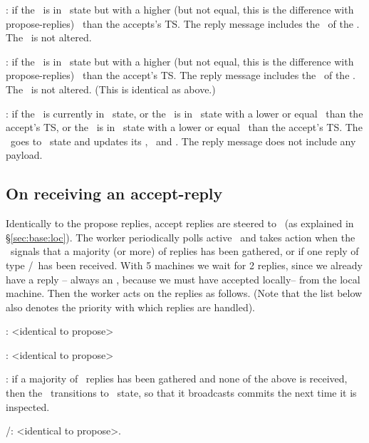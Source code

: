 \item \highprop:  if the \kv~is in \proped~state but with a higher (but not equal, this is the difference with propose-replies) \propts~than the accepts's TS. The reply message includes the \propts~of the \kv. The \kv~is not altered. 

\item \highacc: if the \kv~is in \acced~state but with a higher (but not equal, this is the difference with propose-replies) \propts~than the accept's TS. The reply message includes the \propts~of the \kv. The \kv~is not altered. (This is identical as above.)

\item \ack: if the \kv~is currently in \invalid~state, or the \kv~is in \proped~state with a lower or equal \propts~than the accept's TS, or the \kv~is in \acced~state with a lower or equal \propts~than the accept's TS.
The \kv~goes to \acced~state and updates its \propts, \accts~and \accval. The reply message does not include any payload.
\squishend



\subsection{On receiving an accept-reply}
Identically to the propose replies, accept replies are steered to \locentries~(as explained in \S\ref{sec:base:loc}).
The worker periodically polls active \locentries~and takes action when the \locentry~signals that a majority (or more) of replies has been gathered, or if one reply of type \alreadycom/\loglow~has been received.
With 5 machines we wait for 2 replies, since we already have a reply 
-- always an \ack, because we must have accepted locally--
from the local machine. Then the worker acts on the replies as follows. (Note that the list below also denotes the priority with which replies are handled).

\squishlist

\item \alreadycom: <identical to propose> 

\item \loglow: <identical to propose> 

\item \ack: if a majority of \ack~replies has been gathered and none of the above is received, then the \locentry~transitions to \bcast~state, so that it broadcasts commits the next time it is inspected.

\item \highprop/\highacc: <identical to propose>.

